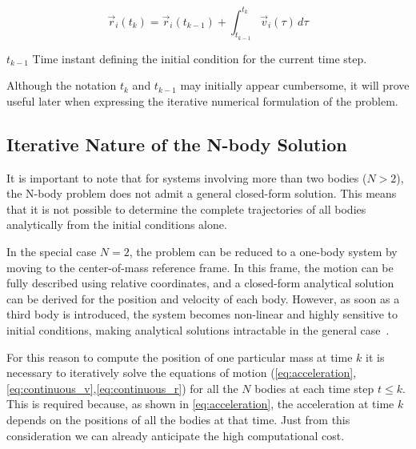 \documentclass{article}
\begin{document}
\begin{equation}
\vec{r}_i(t_k) = \vec{r}_i(t_{k-1}) + \int_{t_{k-1}}^{t_k} \vec{v}_i(\tau)\, d\tau
\label{eq:continuous_r}
\end{equation}
\begin{description}
\item $t_{k-1}$ Time instant defining the initial condition for the current time step.
\end{description}
Although the notation $t_k$ and $t_{k-1}$ may initially appear cumbersome, it will prove useful later when expressing the iterative numerical formulation of the problem.
\subsection{Iterative Nature of the N-body Solution}
It is important to note that for systems involving more than two bodies (\( N > 2 \)), the N-body problem does not admit a general closed-form solution. This means that it is not possible to determine the complete trajectories of all bodies analytically from the initial conditions alone.

In the special case \( N = 2 \), the problem can be reduced to a one-body system by moving to the center-of-mass reference frame. In this frame, the motion can be fully described using relative coordinates, and a closed-form analytical solution can be derived for the position and velocity of each body. However, as soon as a third body is introduced, the system becomes non-linear and highly sensitive to initial conditions, making analytical solutions intractable in the general case~\cite{heggie2005classical}.

For this reason to compute the position of one particular mass at time $k$ it is necessary to iteratively solve the equations of motion (\eqref{eq:acceleration},\eqref{eq:continuous_v},\eqref{eq:continuous_r}) for all the $N$ bodies at each time step $t \leq k$. This is required because, as shown in \eqref{eq:acceleration}, the acceleration at time $k$ depends on the positions of all the bodies at that time.
Just from this consideration we can already anticipate the high computational cost.
\end{document}
